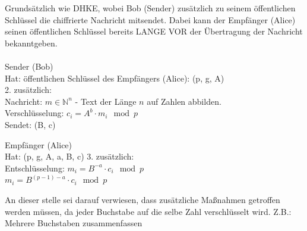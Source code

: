 \documentclass[
  a4paper,
  11pt,
]{article}
\begin{document}
Grundsätzlich wie DHKE, wobei Bob (Sender) zusätzlich zu seinem öffentlichen Schlüssel die chiffrierte Nachricht mitsendet. Dabei kann der Empfänger (Alice)
seinen öffentlichen Schlüssel bereits LANGE VOR der Übertragung der Nachricht bekanntgeben.\\\\

Sender (Bob)\\
Hat: öffentlichen Schlüssel des Empfängers (Alice): (p, g, A)\\
2.	zusätzlich:\\
	Nachricht: ${m\in \mathbb{N}^n}$ - Text der Länge $n$ auf Zahlen abbilden.\\
	Verschlüsselung:	$c_i=A^b\cdot m_i\mod p$\\
	Sendet:	(B, c)

Empfänger (Alice)\\
Hat: (p, g, A, a, B, c)
3.	zusätzlich:\\
	Entschlüsselung:	$m_i=B^{-a}\cdot c_i\mod p$\\
	$m_i=B^{(p-1)-a}\cdot c_i\mod p$
	
An dieser stelle sei darauf verwiesen, dass zusätzliche Maßnahmen getroffen werden müssen, da jeder Buchstabe auf die selbe Zahl verschlüsselt wird.
Z.B.: Mehrere Buchstaben zusammenfassen
\end{document}
